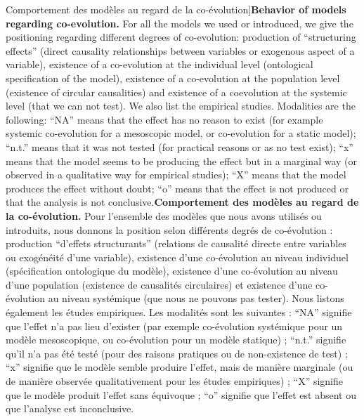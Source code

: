 \begin{table}
\caption[Behavior of models regarding co-evolution][Comportement des modèles au regard de la co-évolution]{\textbf{Behavior of models regarding co-evolution.} For all the models we used or introduced, we give the positioning regarding different degrees of co-evolution: production of ``structuring effects'' (direct causality relationships between variables or exogenous aspect of a variable), existence of a co-evolution at the individual level (ontological specification of the model), existence of a co-evolution at the population level (existence of circular causalities) and existence of a coevolution at the systemic level (that we can not test). We also list the empirical studies. Modalities are the following: ``NA'' means that the effect has no reason to exist (for example systemic co-evolution for a mesoscopic model, or co-evolution for a static model); ``n.t.'' means that it was not tested (for practical reasons or as no test exist); ``x'' means that the model seems to be producing the effect but in a marginal way (or observed in a qualitative way for empirical studies); ``X'' means that the model produces the effect without doubt; ``o'' means that the effect is not produced or that the analysis is not conclusive.\label{tab:contributions:models}}{\textbf{Comportement des modèles au regard de la co-évolution.} Pour l'ensemble des modèles que nous avons utilisés ou introduits, nous donnons la position selon différents degrés de co-évolution : production ``d'effets structurants'' (relations de causalité directe entre variables ou exogénéité d'une variable), existence d'une co-évolution au niveau individuel (spécification ontologique du modèle), existence d'une co-évolution au niveau d'une population (existence de causalités circulaires) et existence d'une co-évolution au niveau systémique (que nous ne pouvons pas tester). Nous listons également les études empiriques. Les modalités sont les suivantes : ``NA'' signifie que l'effet n'a pas lieu d'exister (par exemple co-évolution systémique pour un modèle mesoscopique, ou co-évolution pour un modèle statique) ; ``n.t.'' signifie qu'il n'a pas été testé (pour des raisons pratiques ou de non-existence de test) ; ``x'' signifie que le modèle semble produire l'effet, mais de manière marginale (ou de manière observée qualitativement pour les études empiriques) ; ``X'' signifie que le modèle produit l'effet sans équivoque ; ``o'' signifie que l'effet est absent ou que l'analyse est inconclusive.\label{tab:contributions:models}}
\end{table}
